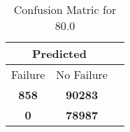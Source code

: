 \begin{table}[] 
\caption{Confusion Matric for 80.0} 
\label{Table: Prediction Accuracy-DMD80.0OnlySunEKF-ignoreReflection200.9EKF-top2-Reflection} 
\centering 
\begin{tabular} 
 {@{}ccc@{}} 
\toprule 
\multicolumn{2}{c}{\textbf{Predicted}}
 \\ \midrule 
\multicolumn{1}{|c|}{Failure} & 
\multicolumn{1}{c|}{No Failure}
 \\ \midrule 
\multicolumn{1}{|c|}{\color{green}\textbf{858}} & 
\multicolumn{1}{c|}{\color{green}\textbf{90283}}
 \\ \midrule 
\multicolumn{1}{|c|}{\color{red}\textbf{0}} & 
\multicolumn{1}{c|}{\color{red}\textbf{78987}}
 \\ \bottomrule 
\end{tabular} 
\end{table} 
